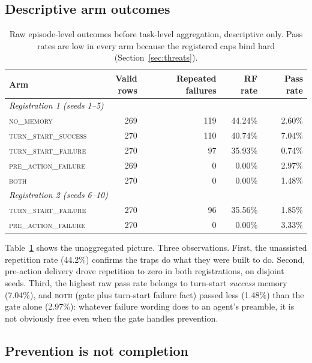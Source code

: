 \documentclass[11pt]{article}
\begin{document}
\subsection{Descriptive arm outcomes}
\label{sec:descriptive}

\begin{table}[t]
\centering
\small
\begin{tabular}{lrrrr}
\toprule
Arm & Valid rows & Repeated failures & RF rate & Pass rate \\
\midrule
\multicolumn{5}{l}{\emph{Registration 1 (seeds 1--5)}} \\
\textsc{no\_memory} & 269 & 119 & 44.24\% & 2.60\% \\
\textsc{turn\_start\_success} & 270 & 110 & 40.74\% & 7.04\% \\
\textsc{turn\_start\_failure} & 270 & 97 & 35.93\% & 0.74\% \\
\textsc{pre\_action\_failure} & 269 & 0 & 0.00\% & 2.97\% \\
\textsc{both} & 270 & 0 & 0.00\% & 1.48\% \\
\midrule
\multicolumn{5}{l}{\emph{Registration 2 (seeds 6--10)}} \\
\textsc{turn\_start\_failure} & 270 & 96 & 35.56\% & 1.85\% \\
\textsc{pre\_action\_failure} & 270 & 0 & 0.00\% & 3.33\% \\
\bottomrule
\end{tabular}
\caption{Raw episode-level outcomes before task-level aggregation,
descriptive only. Pass rates are low in every arm because the registered
caps bind hard (Section~\ref{sec:threats}).}
\label{tab:arms-outcomes}
\end{table}

Table~\ref{tab:arms-outcomes} shows the unaggregated picture. Three
observations. First, the unassisted repetition rate (44.2\%) confirms the
traps do what they were built to do. Second, pre-action delivery drove
repetition to zero in both registrations, on disjoint seeds. Third, the
highest raw pass rate belongs to turn-start \emph{success} memory (7.04\%),
and \textsc{both} (gate plus turn-start failure fact) passed less
(1.48\%) than the gate alone (2.97\%): whatever failure wording does to an
agent's preamble, it is not obviously free even when the gate handles
prevention.

\subsection{Prevention is not completion}
\label{sec:completion}
\end{document}
